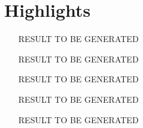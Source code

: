 \documentclass[12pt,a4paper]{article}
\begin{document}
\section*{Highlights}
\begin{itemize}
  \item [RESULT TO BE GENERATED] %
  \item [RESULT TO BE GENERATED] %
  \item [RESULT TO BE GENERATED] %
  \item [RESULT TO BE GENERATED] %
  \item [RESULT TO BE GENERATED] %
\end{itemize}
\end{document}
